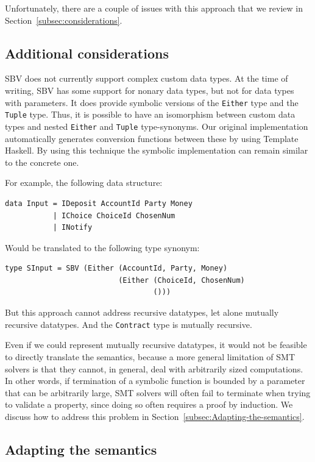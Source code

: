\documentclass[english,runningheads]{llncs}
\begin{document}
Unfortunately, there are a couple of issues with this approach that
we review in Section~\ref{subsec:considerations}.

\subsection{Additional considerations\label{subsec:considerations}}

SBV does not currently support complex custom data types. At the time
of writing, SBV has some support for nonary data types, but not for
data types with parameters.
It does provide symbolic versions of the \texttt{Either} type and the \texttt{Tuple} type.
Thus, it is possible to have an isomorphism between custom data types and
nested \texttt{Either} and \texttt{Tuple} type-synonyms. Our original
implementation automatically generates conversion functions between these
by using Template Haskell. By using this technique the symbolic implementation
can remain similar to the concrete one.

For example, the following data structure:

\begin{verbatim}
data Input = IDeposit AccountId Party Money
           | IChoice ChoiceId ChosenNum
           | INotify
\end{verbatim}

Would be translated to the following type synonym:

\begin{verbatim}
type SInput = SBV (Either (AccountId, Party, Money)
                          (Either (ChoiceId, ChosenNum)
                                  ()))
\end{verbatim}

But this approach cannot address recursive datatypes, let alone mutually
recursive datatypes. And the \texttt{Contract} type is mutually recursive.

Even if we could represent mutually recursive datatypes, it would
not be feasible to directly translate the semantics, because a more
general limitation of SMT solvers is that they cannot, in general,
deal with arbitrarily sized computations. In other words, if termination
of a symbolic function is bounded by a parameter that can be arbitrarily
large, SMT solvers will often fail to terminate when trying to validate
a property, since doing so often requires a proof by induction. We
discuss how to address this problem in Section~\ref{subsec:Adapting-the-semantics}.

\subsection{Adapting the semantics\label{subsec:Adapting-the-semantics}}
\end{document}
